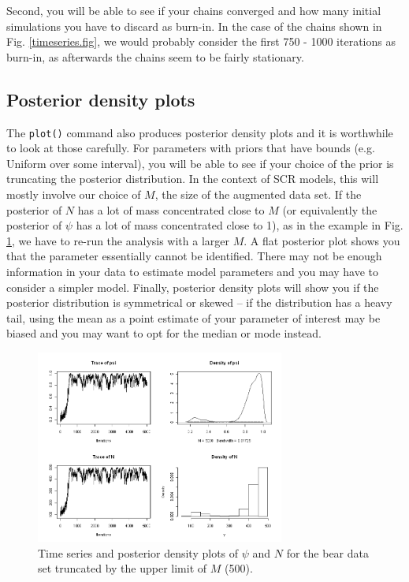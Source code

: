 Second, you will be able to see if your chains converged and how many initial simulations you have to discard as burn-in. In the case of the chains shown in Fig. \ref{timeseries.fig}, we would probably consider the first 750 - 1000 iterations as burn-in, as afterwards the chains seem to be fairly stationary.

\subsection{Posterior density plots}
The \verb#plot()# command also produces posterior density plots and it is worthwhile to look at those carefully. For parameters with priors that have bounds (e.g. Uniform over some interval), you will be able to see if your choice of the prior is truncating the posterior distribution. In the context of SCR models, this will mostly involve our choice of $M$, the size of the augmented data set. If the posterior of $N$ has a lot of mass concentrated close to $M$ (or equivalently the posterior of $\psi$ has a lot of mass concentrated close to 1), as in the example in Fig. \ref{timeseries2.fig}, we have to re-run the analysis with a larger $M$.  A flat posterior plot shows you that the parameter essentially cannot be identified. There may not be enough information in your data to estimate model parameters and you may have to consider a simpler model. Finally, posterior density plots will show you if the posterior distribution is symmetrical or skewed -- if the distribution has a heavy tail, using the mean as a point estimate of your parameter of interest may be biased and you may want to opt for the median or mode instead.

\begin{figure}
\begin{center}
\includegraphics[height=2.5in]{Ch6/figs/timeseries2}
\end{center}
\caption{Time series and posterior density plots of $\psi$ and $N$ for the bear data set truncated by the upper limit of $M$ (500).}
\label{timeseries2.fig}
\end{figure}

